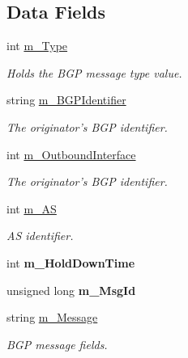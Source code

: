 \subsection*{Data Fields}
\begin{DoxyCompactItemize}
\item 
\hypertarget{classBGPMessage_a9710a231150dd9d3dffde8dabce92fb8}{int \hyperlink{classBGPMessage_a9710a231150dd9d3dffde8dabce92fb8}{m\-\_\-\-Type}}\label{classBGPMessage_a9710a231150dd9d3dffde8dabce92fb8}

\begin{DoxyCompactList}\small\item\em Holds the B\-G\-P message type value. \end{DoxyCompactList}\item 
\hypertarget{classBGPMessage_a4771242e2f77745ed88421240817d85f}{string \hyperlink{classBGPMessage_a4771242e2f77745ed88421240817d85f}{m\-\_\-\-B\-G\-P\-Identifier}}\label{classBGPMessage_a4771242e2f77745ed88421240817d85f}

\begin{DoxyCompactList}\small\item\em The originator's B\-G\-P identifier. \end{DoxyCompactList}\item 
\hypertarget{classBGPMessage_aa6d0e6ed2b166f769d57c255c0cb551a}{int \hyperlink{classBGPMessage_aa6d0e6ed2b166f769d57c255c0cb551a}{m\-\_\-\-Outbound\-Interface}}\label{classBGPMessage_aa6d0e6ed2b166f769d57c255c0cb551a}

\begin{DoxyCompactList}\small\item\em The originator's B\-G\-P identifier. \end{DoxyCompactList}\item 
\hypertarget{classBGPMessage_aaaa12a50a5b5a53bb7235a3f8462d8b1}{int \hyperlink{classBGPMessage_aaaa12a50a5b5a53bb7235a3f8462d8b1}{m\-\_\-\-A\-S}}\label{classBGPMessage_aaaa12a50a5b5a53bb7235a3f8462d8b1}

\begin{DoxyCompactList}\small\item\em A\-S identifier. \end{DoxyCompactList}\item 
\hypertarget{classBGPMessage_aa0928ff15ae83782dc580717bd9e1d8d}{int {\bfseries m\-\_\-\-Hold\-Down\-Time}}\label{classBGPMessage_aa0928ff15ae83782dc580717bd9e1d8d}

\item 
\hypertarget{classBGPMessage_ab556609df97434b77390af0ec1b582ea}{unsigned long {\bfseries m\-\_\-\-Msg\-Id}}\label{classBGPMessage_ab556609df97434b77390af0ec1b582ea}

\item 
\hypertarget{classBGPMessage_ae608943915516251f617ee85b232d979}{string \hyperlink{classBGPMessage_ae608943915516251f617ee85b232d979}{m\-\_\-\-Message}}\label{classBGPMessage_ae608943915516251f617ee85b232d979}

\begin{DoxyCompactList}\small\item\em B\-G\-P message fields. \end{DoxyCompactList}\end{DoxyCompactItemize}
